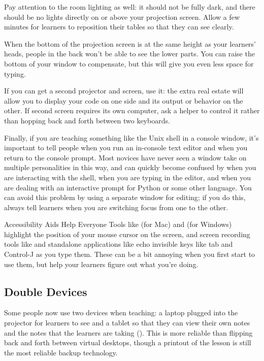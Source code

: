 Pay attention to the room lighting as well:
it should not be fully dark, and there should be no lights directly
on or above your projection screen.
Allow a few minutes for learners to reposition their tables
so that they can see clearly.

When the bottom of the projection screen is at the same height as your learners' heads,
people in the back won't be able to see the lower parts.
You can raise the bottom of your window to compensate,
but this will give you even less space for typing.

If you can get a second projector and screen,
use it:
the extra real estate will allow you to display your code on one side
and its output or behavior on the other.
If second screen requires its own computer,
ask a helper to control it
rather than hopping back and forth between two keyboards.

Finally,
if you are teaching something like the Unix shell in a console window,
it's important to tell people when you run an in-console text editor
and when you return to the console prompt.
Most novices have never seen a window take on multiple personalities in this way,
and can quickly become confused by
when you are interacting with the shell,
when you are typing in the editor,
and when you are dealing with an interactive prompt for Python or some other language.
You can avoid this problem by using a separate window for editing;
if you do this,
always tell learners when you are switching focus from one to the other.

\begin{aside}{Accessibility Aids Help Everyone}
  Tools like  (for Mac)
  and  (for Windows)
  highlight the position of your mouse cursor on the screen,
  and screen recording tools like 
  and standalone applications like 
  echo invisible keys like tab and Control-J as you type them.
  These can be a bit annoying when you first start to use them,
  but help your learners figure out what you're doing.
\end{aside}

\subsection*{Double Devices}

Some people now use two devices when teaching:
a laptop plugged into the projector for learners to see
and a tablet so that they can view their own notes
and the notes that the learners are taking ().
This is more reliable than flipping back and forth between virtual desktops,
though a printout of the lesson is still the most reliable backup technology.

